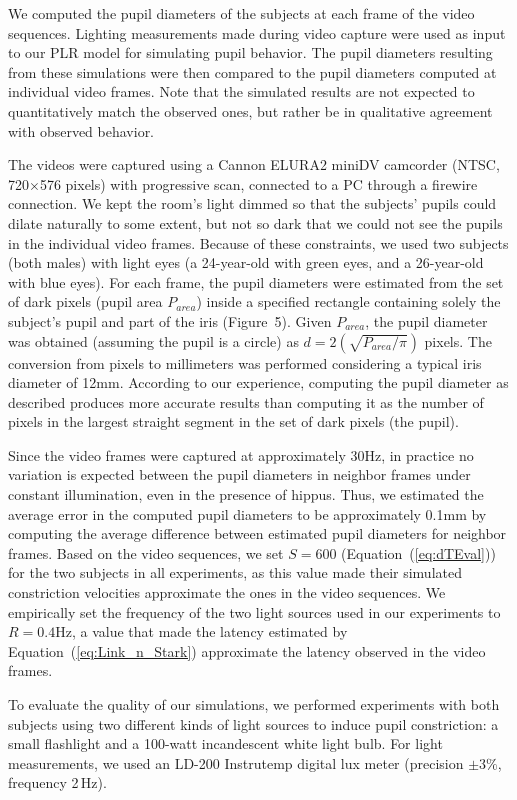 \documentclass{acmtog}
\begin{document}
We computed the pupil diameters of the subjects at each frame of the video sequences.  Lighting measurements made during video capture were used as input to our PLR model for simulating pupil behavior. The pupil diameters resulting from these simulations were then compared to the pupil diameters computed at individual video frames. Note that the simulated results are not
expected to quantitatively match the observed ones, but rather be in qualitative agreement with observed behavior.

The videos were captured using a Cannon ELURA2 miniDV camcorder (NTSC, 720$\times$576 pixels) with progressive scan,
connected to a PC through a firewire connection. 
We kept the room's light dimmed so that the subjects' pupils could dilate naturally to some extent, but not  so dark that
we could not see the pupils in the individual video frames. Because of these constraints, we used two subjects (both males)
with light eyes (a 24-year-old  with green eyes, and a 26-year-old with blue eyes). For each frame, the pupil diameters
were estimated from the set of dark pixels (pupil area $P_{area}$) inside a specified rectangle containing solely the
subject's pupil and part of the iris (Figure~5). Given $P_{area}$, the pupil diameter
was obtained (assuming the pupil is a circle) as $d = 2(\sqrt{P_{area}/\pi})$ pixels. The conversion from pixels
to millimeters was performed considering a typical iris diameter of 12mm. According to our experience, computing the
pupil diameter as described produces more accurate results than computing it as the number of pixels in the largest
straight segment in the set of dark pixels (the pupil).   

Since the video frames were captured at approximately 30Hz, in practice no variation is expected between the pupil diameters in neighbor frames under constant illumination, even in the presence of hippus. 
Thus, we estimated the average error in the computed pupil diameters to be approximately 0.1mm by computing the average difference between estimated pupil diameters for neighbor frames.
Based on the video sequences,  we set $S = 600$ (Equation~(\ref{eq:dTEval})) for the two subjects in all experiments, as this value made their simulated constriction velocities approximate the ones in the video sequences. We empirically set the frequency of the two light sources used in our experiments to $R =
0.4$Hz, a value that made the latency estimated by Equation~(\ref{eq:Link_n_Stark}) approximate the latency observed in the
video frames.

To evaluate the quality of our simulations, we performed experiments with both subjects using two different kinds of light sources to induce pupil constriction: a small flashlight and a
100-watt incandescent white light bulb. For light measurements, we used an LD-200 Instrutemp digital lux meter (precision
$\pm3\%$, frequency 2\,Hz). 
\end{document}
